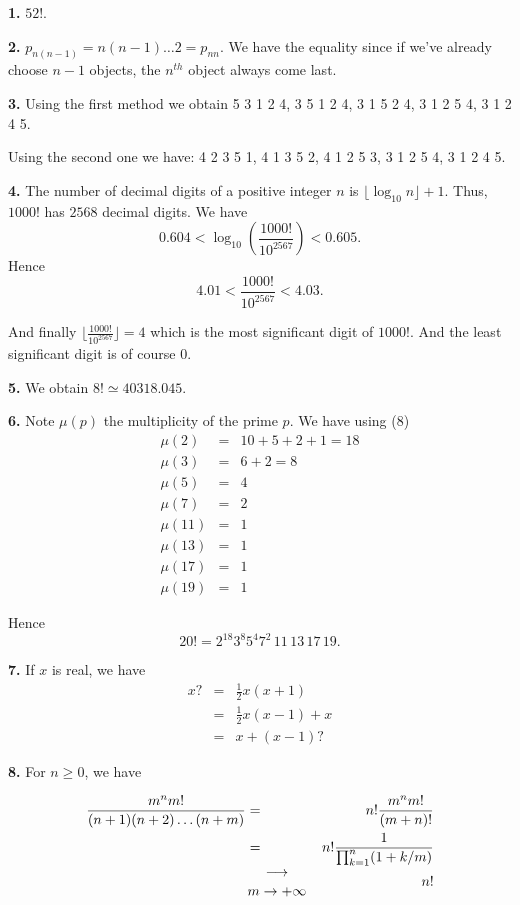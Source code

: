 \documentclass[a4paper,12pt]{article}
\newcommand{\newpar}[1]{\bigskip \noindent \textbf{#1.}}
\begin{document}
\newpar{1} $52!$.

\newpar{2} $p_{n(n-1)} = n(n-1) \ldots 2 = p_{nn}$.  We have the
equality since if we've already choose $n-1$ objects, the $n^{th}$
object always come last.

\newpar{3} Using the first method we obtain 5 3 1 2 4, 3 5 1 2 4, 3 1
5 2 4, 3 1 2 5 4, 3 1 2 4 5.

Using the second one we have: 4 2 3 5 1, 4 1 3 5 2, 4 1 2 5 3, 3 1 2 5
4, 3 1 2 4 5.

\newpar{4} The number of decimal digits of a positive integer $n$ is
$\lfloor \log_{10} n\rfloor + 1$.  Thus, $1000!$ has $2568$ decimal
digits.
We have
\[ 0.604 < \log_{10} \left(\frac{1000!}{10^{2567}}\right) < 0.605.\]
Hence
\[ 4.01 < \frac{1000!}{10^{2567}} < 4.03.\]

And finally $\lfloor \frac{1000!}{10^{2567}} \rfloor = 4$  which is
the most significant digit of $1000!$.  And the least significant
digit is of course $0$.

\newpar{5} We obtain $8! \simeq 40318.045$.

\newpar{6} Note $\mu(p)$ the multiplicity of the prime $p$.  We have
using (8)
\begin{eqnarray*}
  \mu(2) &=& 10 + 5 + 2 + 1 = 18 \\
  \mu(3) &=& 6 + 2 = 8 \\
  \mu(5) &=& 4 \\
  \mu(7) &=& 2 \\
  \mu(11) &=& 1 \\
  \mu(13) &=& 1 \\
  \mu(17) &=& 1 \\
  \mu(19) &=& 1
\end{eqnarray*}

Hence
\[ 20! = 2^{18} 3^8 5 ^4 7^2\,11\,13\,17\,19.\]

\newpar{7} If $x$ is real, we have
\begin{eqnarray*}
  x? &=& \frac{1}{2} x (x+1) \\
  &=& \frac{1}{2}x(x-1) + x \\
  &=& x + (x-1)?
\end{eqnarray*}

\newpar{8} For $n\ge 0$, we have

\begin{eqnarray*}
  \frac{m^n m!}{(n+1)(n+2) \ldots(n+m)}
  &=& n!\frac{m^n m!}{(m+n)!} \\
  &=& n! \frac{1}{\prod_{k=1}^n (1+k/m)} \\
  &{\longrightarrow \atop {m \to +\infty}}& n!
\end{eqnarray*}
\end{document}
